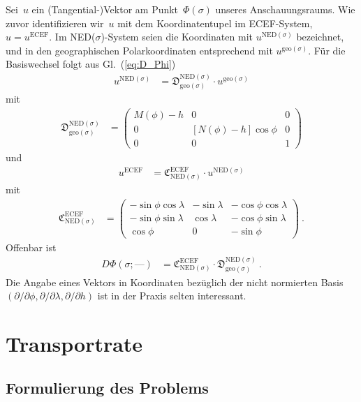 \documentclass[10pt,a4paper]{article}
\newcommand{\nul}{\textrm{---}}
\begin{document}
Sei~$u$ ein (Tangential-)Vektor am Punkt~$\Phi(\sigma)$ unseres Anschauungsraums.
Wie zuvor identifizieren wir~$u$ mit dem Koordinatentupel im ECEF-System, $u=u^{\mathrm{ECEF}}$.
Im NED($\sigma$)-System seien die Koordinaten mit $u^{\mathrm{NED}(\sigma)}$ bezeichnet, und in den geographischen Polarkoordinaten entsprechend mit $u^{\mathrm{geo}(\sigma)}$.
Für die Basiswechsel folgt aus Gl.~(\ref{eq:D_Phi})
\begin{align}
	u^{\mathrm{NED}(\sigma)} &= 
	\mathfrak{D}^{\mathrm{NED}(\sigma)}_{\mathrm{geo}(\sigma)}
	\cdot
	u^{\mathrm{geo}(\sigma)}
\end{align}
mit 
\begin{align}
	\mathfrak{D}^{\mathrm{NED}(\sigma)}_{\mathrm{geo}(\sigma)} &= 
	\begin{pmatrix}
		M(\phi) - h & 0 & 0 \\
		0 & [N(\phi) - h]\cos\phi & 0 \\
		0 & 0 & 1				
	\end{pmatrix}
\end{align}
und
\begin{align}
	u^{\mathrm{ECEF}} &= 
	\mathfrak{C}^{\mathrm{ECEF}}_{\mathrm{NED}(\sigma)}
	\cdot
	u^{\mathrm{NED}(\sigma)}
\end{align}
mit 
\begin{align}
	\mathfrak{C}^{\mathrm{ECEF}}_{\mathrm{NED}(\sigma)} &= 
	\begin{pmatrix}
		-\sin\phi\cos\lambda & -\sin\lambda & -\cos\phi\cos\lambda\\
		-\sin\phi\sin\lambda & \cos\lambda & -\cos\phi\sin\lambda\\
		\cos\phi & 0 & -\sin\phi
	\end{pmatrix}
	\ .
\end{align}
Offenbar ist
\begin{align}
\label{eq:D_Phi_decomposition}
	D\Phi(\sigma; \nul)
	&=
	\mathfrak{C}^{\mathrm{ECEF}}_{\mathrm{NED}(\sigma)}
	\cdot
	\mathfrak{D}^{\mathrm{NED}(\sigma)}_{\mathrm{geo}(\sigma)}
	\ .
\end{align}
Die Angabe eines Vektors in Koordinaten bezüglich der nicht normierten Basis $(\partial/\partial\phi,\partial/\partial\lambda,\partial/\partial h)$ ist in der Praxis selten interessant.


\section{Transportrate}

\subsection{Formulierung des Problems}
\end{document}
